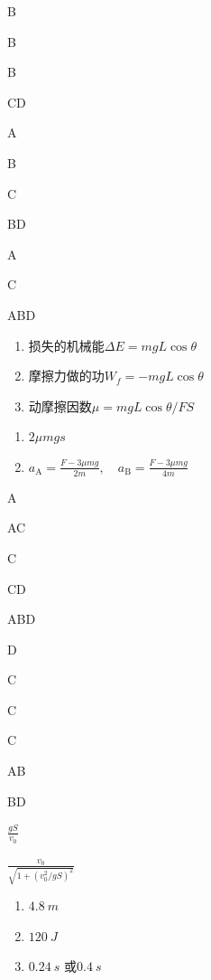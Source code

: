 \item B
\item B
\item B
\item CD
\item A
\item B
\item C
\item BD
\item A
\item C
\item ABD
\item \begin {enumerate} \renewcommand {\labelenumi }{\arabic {enumi}.} \item 损失的机械能$\Delta E = m g L \cos \theta $ \item 摩擦力做的功$W _ { f } = - m g L \cos \theta $ \item 动摩擦因数$\mu = m g L \cos \theta / F S$ \par \par \par \end {enumerate} \par \par 
\item \begin {enumerate} \renewcommand {\labelenumi }{\arabic {enumi}.} \item $2 \mu m g s$ \item $a _ { \mathrm { A } } = \frac { F - 3 \mu m g } { 2 m } , \quad a _ { \mathrm { B } } = \frac { F - 3 \mu m g } { 4 m }$ \par \end {enumerate} \par \par 
\item A
\item AC
\item C
\item CD
\item ABD
\item D
\item C
\item C
\item C
\item AB
\item BD
\item $\frac { g S } { v _ { 0 } }$
\item $\frac { v _ { 0 } } { \sqrt { 1 + \left ( v _ { 0 } ^ { 2 } / g S \right ) ^ { 2 } } }$
\item \begin {enumerate} \renewcommand {\labelenumi }{\arabic {enumi}.} \item $ 4.8\ m $ \item $ 120 \ J $ \item $ 0.24\ s $ 或$ 0.4\ s $ \par \end {enumerate} \par \par 
